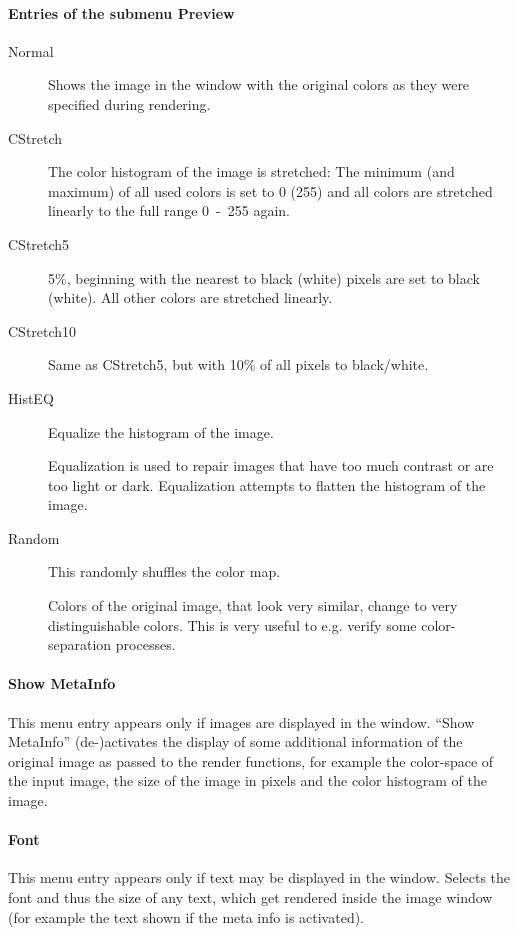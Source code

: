 \paragraph{Entries of the submenu Preview}

\begin{description}
\item[Normal] Shows the image in the window with the original colors
  as they were specified during rendering.

\item[CStretch] The color histogram of
  the image is stretched: The minimum (and maximum) of all used
  colors is set to 0 (255) and all colors are stretched linearly to
  the full range 0~-~255 again.

\item[CStretch5] 5\%, beginning with the nearest to black (white)
  pixels are set to black (white). All other colors are stretched
  linearly.

\item[CStretch10] Same as CStretch5, but with 10\% of all pixels to
  black/white.

\item[HistEQ] 
  Equalize the histogram of the image.

  Equalization is used to repair images that have too much contrast
  or are too light or dark. Equalization attempts to flatten the
  histogram of the image.

\item[Random] This randomly shuffles the color map.

  Colors of the original image, that look very similar, change to
  very distinguishable colors. This is very useful to e.g. verify
  some color-separation processes.
\end{description}

\paragraph{Show MetaInfo}
This menu entry appears only if images are displayed in the window.
``Show MetaInfo'' (de-)activates the display of some additional
information of the original image as passed to the render functions,
for example the color-space of the input image, the size of the
image in pixels and the color histogram of the image.

\paragraph{Font}
This menu entry appears only if text may be displayed in the window.
Selects the font and thus the size of any text, which get rendered
inside the image window (for example the text shown if the meta info
is activated).

